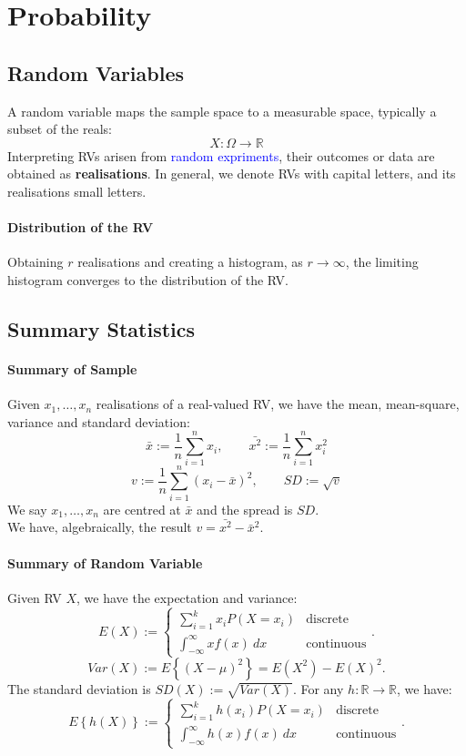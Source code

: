 \section{Probability}
\subsection{Random Variables}
A \textcolor{Bittersweet}{random variable} maps the sample space
to a measurable space, typically a subset of the reals:
\[X:\Omega\to \mathbb{R}\]
Interpreting RVs arisen from \textcolor{Blue}{random expriments}, their
outcomes or data are obtained as \textbf{realisations}. In
general, we denote RVs with capital letters, and its realisations small
letters.

\paragraph{Distribution of the RV}
Obtaining $r$ realisations and creating a histogram, as $r\to \infty$, the
limiting histogram converges to the \textcolor{Bittersweet}{distribution} of the RV\@.


\subsection{Summary Statistics}
\paragraph{Summary of Sample}
Given $x_1,\ldots,x_{n}$ realisations of a real-valued RV, we have the
\textcolor{Bittersweet}{mean}, \textcolor{Bittersweet}{mean-square},
\textcolor{Bittersweet}{variance} and \textcolor{Bittersweet}{standard
deviation}:
\[\bar{x}:=\frac{1}{n}\sum_{i=1}^{n} x_i,\qquad \bar{x^{2}}:=\frac{1}{n}\sum_{i=1}^{n} x_i^{2}\]
\[v:=\frac{1}{n}\sum_{i=1}^{n} {\left( x_i-\bar{x} \right) }^{2},\qquad SD:=\sqrt{v}\] 
We say $x_1,\ldots,x_{n}$ are \textcolor{Bittersweet}{centred at $\bar{x}$} and
the \textcolor{Bittersweet}{spread} is $SD$.\\
We have, algebraically, the result $v=\bar{x^{2}}-{\bar{x}}^{2}$.

\paragraph{Summary of Random Variable}
Given RV $X$, we have the \textcolor{Bittersweet}{expectation} and
\textcolor{Bittersweet}{variance:}
\[E(X):=\begin{cases}\sum_{i=1}^{k} x_i P(X=x_i)&\text{discrete}\\\int_{{-\infty}}^{{\infty}} {x f(x)} \: d{x} {}& \text{continuous}\end{cases}.\]
\[Var(X):=E \left\{ {\left( X-\mu \right) }^{2} \right\}=E(X^{2})-E(X)^{2}.\]
The \textcolor{Bittersweet}{standard deviation} is $SD(X):=\sqrt{Var(X)}$. For
any $h:\mathbb{R}\to\mathbb{R}$, we have:
\[E \left\{ h(X) \right\}:=\begin{cases}\sum_{i=1}^{k} h(x_i) P(X=x_i)&\text{discrete}\\\int_{{-\infty}}^{{\infty}} {h(x) f(x)} \: d{x} {}& \text{continuous}\end{cases}.\]


